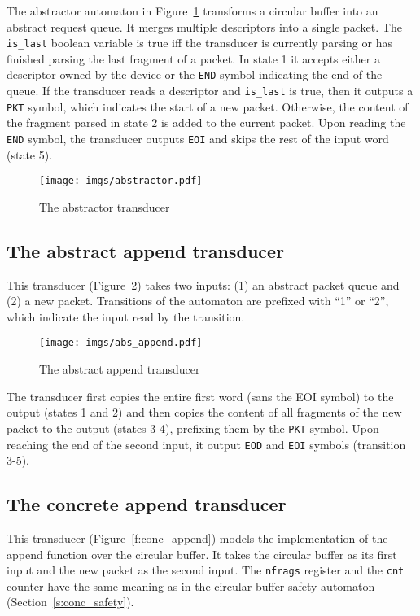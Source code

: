 \documentclass{article}
\begin{document}
The abstractor automaton in Figure~\ref{f:abstractor} transforms a 
circular buffer into an abstract request queue.  It merges 
multiple descriptors into a single packet.  The \texttt{is\_last} 
boolean variable is true iff the transducer is currently parsing 
or has finished parsing the last fragment of a packet.  In state 1 
it accepts either a descriptor owned by the device or the 
\texttt{END} symbol indicating the end of the queue.  If the 
transducer reads a descriptor and \texttt{is\_last} is true, then 
it outputs a \texttt{PKT} symbol, which indicates the start of a 
new packet.  Otherwise, the content of the fragment parsed in 
state 2 is added to the current packet.  Upon reading the 
\texttt{END} symbol, the transducer outputs \texttt{EOI} and skips 
the rest of the input word (state 5).

\begin{figure}[t]
    \center
    \texttt{[image: imgs/abstractor.pdf]}
    \caption{The abstractor transducer}\label{f:abstractor}
\end{figure}


\subsection{The abstract append transducer}
 
This transducer (Figure~\ref{f:abs_append}) takes two inputs: (1) 
an abstract packet queue and (2) a new packet.  Transitions of the 
automaton are prefixed with ``1'' or ``2'', which indicate the 
input read by the transition.

\begin{figure}[t]
    \center
    \texttt{[image: imgs/abs\_append.pdf]}
    \caption{The abstract append transducer}\label{f:abs_append}
\end{figure}


The transducer first copies the entire first word (sans the EOI 
symbol) to the output (states 1 and 2) and then copies the content 
of all fragments of the new packet to the output (states 3-4), 
prefixing them by the \texttt{PKT} symbol.  Upon reaching the end 
of the second input, it output \texttt{EOD} and \texttt{EOI} 
symbols (transition 3-5).

\subsection{The concrete append transducer}

This transducer (Figure~\ref{f:conc_append}) models the 
implementation of the append function over the circular buffer.  
It takes the circular buffer as its first input and the new packet 
as the second input.  The \texttt{nfrags} register and the 
\texttt{cnt} counter have the same meaning as in the circular 
buffer safety automaton (Section~\ref{s:conc_safety}).
\end{document}
